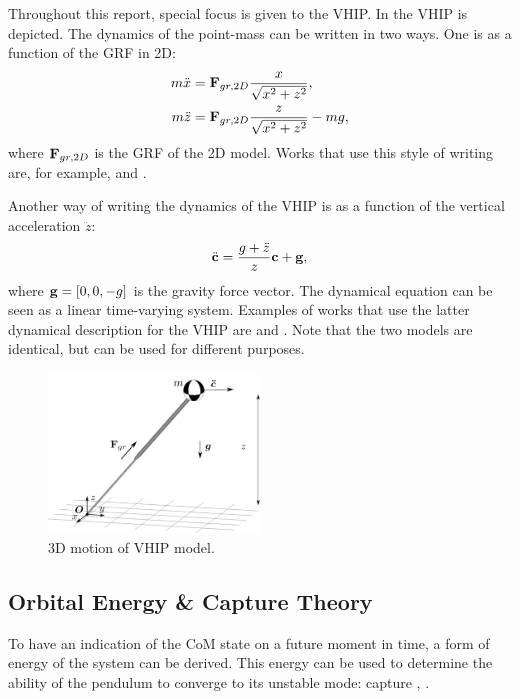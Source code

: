 Throughout this report, special focus is given to the \ac{VHIP}. In  the \ac{VHIP} is depicted. The dynamics of the point-mass can be written in two ways. One is as a function of the \ac{GRF} in \ac{2D}:
\begin{align}
	m\ddot{x} &= \mathbf{F}_{gr,2D}\frac{x}{\sqrt{x^2 + z^2}},\\
	m\ddot{z} &= \mathbf{F}_{gr,2D}\frac{z}{\sqrt{x^2 + z^2}} - mg,
	\label{eq:dynamicsprattstyle}
\end{align}
where $\mathbf{F}_{gr,2D}$ is the \ac{GRF} of the \ac{2D}  model. Works that use this style of writing are, for example, \cite{pratt2007derivation} and \cite{koolen2016balance}.

Another way of writing the dynamics of the \ac{VHIP} is as a function of the vertical acceleration $\ddot{z}$:
\begin{equation}
	\ddot{\mathbf{c}} = \frac{g+\ddot{z}}{z}\mathbf{c} + \mathbf{g},
	\label{eq:dynamicscaronstyle}
\end{equation}
where $\mathbf{g}=[0,0,-g]$ is the gravity force vector. The dynamical equation can be seen as a linear time-varying system. Examples of works that use the latter dynamical description for the \ac{VHIP} are \cite{hopkins2014humanoid} and \cite{caron2018balance}. Note that the two models are identical, but can be used for different purposes.
\begin{figure}
\centering
\includegraphics[width=0.5\textwidth]{STYLESTUFF/3DCoMwithoutfootVHIP.png}
\caption{\ac{3D} motion of \ac{VHIP} model.}
\label{fig:3dlip}
\end{figure}

\subsection{Orbital Energy \& Capture Theory}\label{sec:ewalking}
To have an indication of the \ac{CoM} state on a future moment in time, a form of energy of the system can be derived. This energy can be used to determine the ability of the pendulum to converge to its unstable mode: capture \cite{pratt2006capture}, \cite{koolen2012capturability}.

